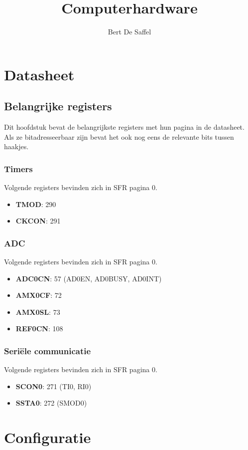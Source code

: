\documentclass{report}
\title{Computerhardware}
\author{Bert De Saffel}
\begin{document}
\maketitle
\tableofcontents

\part{Datasheet}
\chapter{Belangrijke registers}
Dit hoofdstuk bevat de belangrijkste registers met hun pagina in de datasheet. Als ze bitadresseerbaar zijn bevat het ook nog eens de relevante bits tussen haakjes.
\section{Timers}
Volgende registers bevinden zich in SFR pagina 0.
\begin{itemize}
\item \textbf{TMOD}: 290
\item \textbf{CKCON}: 291
\end{itemize}

\section{ADC}
Volgende registers bevinden zich in SFR pagina 0.
\begin{itemize}
\item \textbf{ADC0CN}: 57    (AD0EN, AD0BUSY, AD0INT)
\item \textbf{AMX0CF}: 72  
\item \textbf{AMX0SL}: 73
\item \textbf{REF0CN}: 108
\end{itemize}

\section{Seriële communicatie}
Volgende registers bevinden zich in SFR pagina 0.
\begin{itemize}
\item \textbf{SCON0}: 271    (TI0, RI0)
\item \textbf{SSTA0}: 272    (SMOD0)
\end{itemize}

\part{Configuratie}
\end{document}
